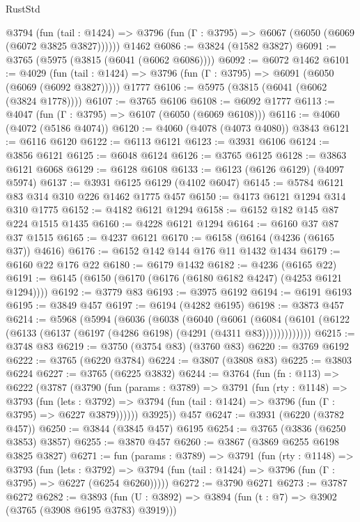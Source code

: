 \begin{lexlean}{RustStd}
\begin{coremodule}
    @3794
      (fun (tail : @1424) => @3796 (fun (Γ : @3795) => @6067 (@6050 (@6069 (@6072 @3825 @3827))))))
    @1462
@6086 := @3824 (@1582 @3827)
@6091 := @3765 (@5975 (@3815 (@6041 (@6062 @6086))))
@6092 := @6072 @1462
@6101 := @4029
    (fun (tail : @1424) => @3796 (fun (Γ : @3795) => @6091 (@6050 (@6069 (@6092 @3827)))))
    @1777
@6106 := @5975 (@3815 (@6041 (@6062 (@3824 @1778))))
@6107 := @3765 @6106
@6108 := @6092 @1777
@6113 := @4047 (fun (Γ : @3795) => @6107 (@6050 (@6069 @6108)))
@6116 := @4060 (@4072 (@5186 @4074))
@6120 := @4060 (@4078 (@4073 @4080)) @3843
@6121 := @6116 @6120
@6122 := @6113 @6121
@6123 := @3931 @6106
@6124 := @3856 @6121
@6125 := @6048 @6124
@6126 := @3765 @6125
@6128 := @3863 @6121 @6068
@6129 := @6128 @6108
@6133 := @6123 (@6126 @6129) (@4097 @5974)
@6137 := @3931 @6125 @6129 (@4102 @6047)
@6145 := @5784 @6121 @83 @314 @310 @226 @1462 @1775 @457
@6150 := @4173 @6121 @1294 @314 @310 @1775
@6152 := @4182 @6121 @1294
@6158 := @6152 @182 @145 @87 @224 @1515 @1435
@6160 := @4228 @6121 @1294
@6164 := @6160 @37 @87 @37 @1515
@6165 := @4237 @6121
@6170 := @6158 (@6164 (@4236 (@6165 @37)) @4616)
@6176 := @6152 @142 @144 @176 @11 @1432 @1434
@6179 := @6160 @22 @176 @22
@6180 := @6179 @1432
@6182 := @4236 (@6165 @22)
@6191 := @6145 (@6150 (@6170 (@6176 (@6180 @6182 @4247) (@4253 @6121 @1294))))
@6192 := @3779 @83
@6193 := @3975 @6192
@6194 := @6191 @6193
@6195 := @3849 @457
@6197 := @6194 (@4282 @6195)
@6198 := @3873 @457
@6214 := @5968
    (@5994
      (@6036
        (@6038
          (@6040
            (@6061
              (@6084 (@6101 (@6122 (@6133 (@6137 (@6197 (@4286 @6198) (@4291 (@4311 @83)))))))))))))
@6215 := @3748 @83
@6219 := @3750 (@3754 @83) (@3760 @83)
@6220 := @3769 @6192
@6222 := @3765 (@6220 @3784)
@6224 := @3807 (@3808 @83)
@6225 := @3803 @6224
@6227 := @3765 (@6225 @3832)
@6244 := @3764
    (fun (fn : @113) =>
    @6222
      (@3787
        (@3790
          (fun (params : @3789) =>
          @3791
            (fun (rty : @1148) =>
            @3793
              (fun (lets : @3792) =>
              @3794 (fun (tail : @1424) => @3796 (fun (Γ : @3795) => @6227 @3879))))))
        @3925))
    @457
@6247 := @3931 (@6220 (@3782 @457))
@6250 := @3844 (@3845 @457) @6195
@6254 := @3765 (@3836 (@6250 @3853) @3857)
@6255 := @3870 @457
@6260 := @3867 (@3869 @6255 @6198 @3825 @3827)
@6271 := fun (params : @3789) =>
  @3791
    (fun (rty : @1148) =>
    @3793
      (fun (lets : @3792) =>
      @3794 (fun (tail : @1424) => @3796 (fun (Γ : @3795) => @6227 (@6254 @6260)))))
@6272 := @3790 @6271
@6273 := @3787 @6272
@6282 := @3893 (fun (U : @3892) => @3894 (fun (t : @7) => @3902 (@3765 (@3908 @6195 @3783) @3919)))

\end{coremodule}
\end{lexlean}
